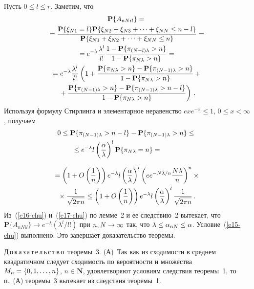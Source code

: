 \begin{multicols}{2}
Пусть $0\le l\le r$. Заметим, что
\begin{multline}
\mathbf{P}\{A_{nNil}\} ={}\\
{}=\displaystyle\frac{\displaystyle \mathbf{P}\{\xi_{N1}=l\}\mathbf{P}\{
 \xi_{N2}+\xi_{N3}+ \dots +\xi_{NN}\le n-l\}\mathstrut}{\displaystyle \mathbf{P}\{
 \xi_{N1}+\xi_{N2}+ \dots +\xi_{NN}\le n\}\mathstrut}={}\\
 {}=
e^{-\lambda}\displaystyle\frac{\displaystyle \lambda^l\mathstrut}{\displaystyle l!\mathstrut}\frac{1-\mathbf{P}
\{\pi_{(N-l)\lambda}>n\}}{1-\mathbf{P}\{\pi_{N\lambda}>n\}}={}\\
{}= 
e^{-\lambda}\displaystyle\frac{\displaystyle \lambda^l\mathstrut}{\displaystyle l!\mathstrut}\left(1+\displaystyle\frac{\displaystyle \mathbf{P}
\{\pi_{N\lambda}>n\}-\mathbf{P}\{\pi_{(N-1)\lambda}>n\}\mathstrut}{\displaystyle 1-\mathbf{P}
\{\pi_{N\lambda}>n\}\mathstrut}+{}\right.\\
\left.{}+\displaystyle\frac{\displaystyle \mathbf{P}\{\pi_{(N-1)\lambda}>n\}-\mathbf{P}
\{\pi_{(N-1)\lambda}>n-l\}\mathstrut}{\displaystyle 1-\mathbf{P}\{\pi_{N\lambda}>n\}\mathstrut}\right)\,.
\label{e16-chu}
\end{multline}
Используя формулу   Стирлинга и элементарное неравенство
$exe^{-x}\le 1$, $0\le x<\infty$, получаем
\begin{multline*}
0\le \mathbf{P}\{\pi_{(N-1)\lambda}>n-l\}-\mathbf{P}\{
\pi_{(N-1)\lambda}>n\}\le{}\\
{}\le
 e^{-\lambda} l\left(\fr{\alpha}{\lambda}\right)^l\mathbf{P}\{\pi_{N\lambda}=n\}={}\hspace*{10mm}
\end{multline*}
 
\noindent
\begin{multline}
{}=
\left(1+O\left(\frac{1}{n}\right)\right) e^{-\lambda}
l\left(\displaystyle\frac{\displaystyle \alpha\mathstrut}{\displaystyle \lambda\mathstrut}\right)^l\left(e
e^{-{N\lambda}/{n}}\displaystyle\frac{\displaystyle N\lambda\mathstrut}{\displaystyle n\mathstrut}\right)^n\times{}
\\
{}\times
\displaystyle\frac{\displaystyle 1\mathstrut}{\displaystyle \sqrt{2\pi n}\mathstrut}\le
\left(1+O\left(\displaystyle\frac{\displaystyle 1\mathstrut}{\displaystyle n\mathstrut}\right)\right)
e^{-\lambda} l\left(\displaystyle\frac{\displaystyle \alpha\mathstrut}{\displaystyle \lambda\mathstrut}\right)^l
\displaystyle\frac{\displaystyle 1\mathstrut}{\displaystyle \sqrt{2\pi n}\mathstrut}\,. \label{e17-chu}
\end{multline}
Из~(\ref{e16-chu}) и~(\ref{e17-chu})
  по  лемме~2 и ее следствию~2 вытекает, что  
  $ \mathbf{P}\{A_{nNil}\}\to e^{-\lambda} ({\lambda^l}/{l!})$ при $n,
N\hm\to\infty$ так, что $\lambda\le\alpha_{nN}\hm\le\alpha$. Условие~(\ref{e15-chu})
выполнено. Это завершает доказательство теоремы.

\medskip

\noindent
Д\,о\,к\,а\,з\,а\,т\,е\,л\,ь\,с\,т\,в\,о\  теоремы~3. (А)~Так как из сходимости в
среднем квадратичном следует сходимость по вероятности и множества
$M_n\hm=\{0, 1,\dots, n\}$, $n\in\mathbf{N}$, удовлетворяют условиям
следствия теоремы~1, то п.~(А) теоремы~3 вытекает из следствия
теоремы~1.


\end{multicols}
